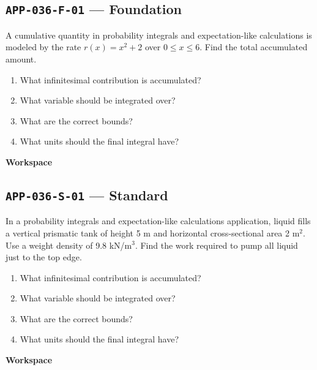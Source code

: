 \documentclass[11pt]{book}
\newcommand{\pid}[1]{\texttt{#1}}
\newcommand{\workspace}{\par\vspace{0.7in}\hrulefill\par\vspace{0.55in}\hrulefill\par}
\begin{document}
\subsection*{\pid{APP-036-F-01} — Foundation}
\begin{problembox}
A cumulative quantity in probability integrals and expectation-like calculations is modeled by the rate $r(x)=x^2+2$ over $0\le x\le 6$. Find the total accumulated amount.
\end{problembox}
\begin{promptbox}\begin{enumerate}
\item What infinitesimal contribution is accumulated?
\item What variable should be integrated over?
\item What are the correct bounds?
\item What units should the final integral have?
\end{enumerate}\end{promptbox}
\textbf{Workspace}\workspace
{}
\subsection*{\pid{APP-036-S-01} — Standard}
\begin{problembox}
In a probability integrals and expectation-like calculations application, liquid fills a vertical prismatic tank of height 5 m and horizontal cross-sectional area 2 m$^2$. Use a weight density of 9.8 kN/m$^3$. Find the work required to pump all liquid just to the top edge.
\end{problembox}
\begin{promptbox}\begin{enumerate}
\item What infinitesimal contribution is accumulated?
\item What variable should be integrated over?
\item What are the correct bounds?
\item What units should the final integral have?
\end{enumerate}\end{promptbox}
\textbf{Workspace}\workspace
{}
\end{document}

